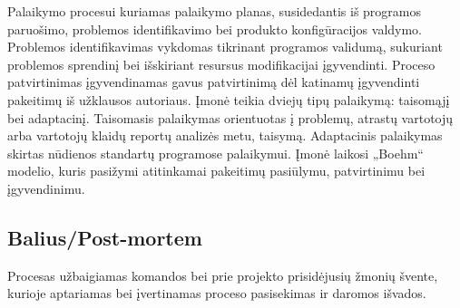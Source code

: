\documentclass{VUMIFPSkursinis}
\begin{document}
	Palaikymo procesui kuriamas palaikymo planas, susidedantis iš programos paruošimo, problemos identifikavimo bei produkto konfigūracijos valdymo.
	Problemos identifikavimas vykdomas tikrinant programos validumą, sukuriant problemos sprendinį bei išskiriant resursus modifikacijai įgyvendinti.
	Proceso patvirtinimas įgyvendinamas gavus patvirtinimą dėl katinamų įgyvendinti pakeitimų iš užklausos autoriaus.
	Įmonė teikia dviejų tipų palaikymą: taisomąjį bei adaptacinį. Taisomasis palaikymas orientuotas į problemų, atrastų vartotojų arba vartotojų klaidų reportų analizės metu, taisymą.
	Adaptacinis palaikymas skirtas nūdienos standartų programose palaikymui. Įmonė laikosi „Boehm“ modelio, kuris pasižymi atitinkamai pakeitimų pasiūlymu, patvirtinimu bei įgyvendinimu.
	\label{img:boehmsModel}

	\subsection{Balius/Post-mortem}
	Procesas užbaigiamas komandos bei prie projekto prisidėjusių žmonių švente, kurioje aptariamas bei įvertinamas proceso pasisekimas ir daromos išvados.
\end{document}
